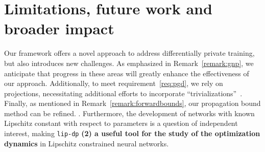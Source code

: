 
\vspace{-0.2cm}
\section{Limitations, future work and broader impact}
\vspace{-0.2cm}

Our framework offers a novel approach to address differentially private training, but also introduces new challenges.  As emphasized in Remark~\ref{remark:gnp}, we anticipate that progress in these areas will greatly enhance the effectiveness of our approach.  
Additionally, to meet requirement~\ref{req:pgd}, we rely on projections, necessitating additional efforts to incorporate ``trivializations''~\cite{trockman2021orthogonalizing,singla2021skew}. %
Finally, as mentioned in Remark~\ref{remark:forwardbounds}, our propagation bound method can be refined. . %
Furthermore, the development of networks with known Lipschitz constant with respect to parameters is a question of independent interest, making \lstinline[basicstyle=\ttfamily, backgroundcolor=\color{gray!20}]{lip-dp} \textbf{(2) a useful tool for the study of the optimization dynamics} in Lipschitz constrained neural networks.


